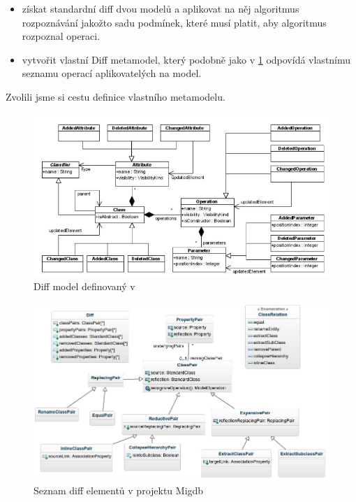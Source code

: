 \documentclass[11pt,twoside,a4paper]{book}
\begin{document}
\begin{itemize}
  	\item získat standardní diff dvou modelů a aplikovat na něj algoritmus
  	rozpoznávání jakožto sadu podmínek, které musí platit, aby algoritmus rozpoznal operaci.
	\item vytvořit vlastní Diff metamodel, který podobně jako v
	\ref{fig:diff_cincetti} odpovídá vlastnímu seznamu operací aplikovatelých na
	model.
\end{itemize}

Zvolili jsme si cestu definice vlastního metamodelu.

\begin{figure}[H]
\begin{center}
\includegraphics[width=15cm]{figures/uml_diference_cincetti}
\caption{Diff model definovaný v \cite{Cincetti}}
\label{fig:diff_cincetti}
\end{center}
\end{figure}

\begin{figure}[H]
\begin{center}
\includegraphics[width=15cm]{figures/diff_metamodel}
\caption{Seznam diff elementů v projektu Migdb}
\label{fig:diff_meta}
\end{center}
\end{figure}
\end{document}
